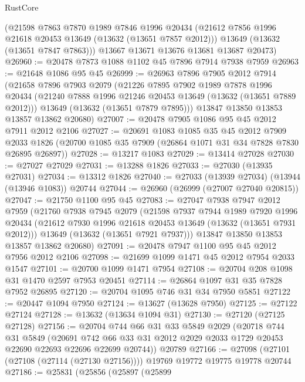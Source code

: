 \begin{lexlean}{RustCore}
\begin{coremodule}
      (@21598
        @7863
        @7870
        @1989
        @7846
        @1996
        @20434
        (@21612 @7856 @1996 @21618 @20453 @13649 (@13632 (@13651 @7857 @2012)))
        @13649
        (@13632 (@13651 @7847 @7863)))
      @13667
      @13671
      @13676
      @13681
      @13687
      @20473)
@26960 := @20478 @7873 @1088 @1102 @45 @7896 @7914 @7938 @7959
@26963 := @21648 @1086 @95 @45
@26999 := @26963
    @7896
    @7905
    @2012
    @7914
    (@21658
      @7896
      @7903
      @2079
      (@21226
        @7895
        @7902
        @1989
        @7878
        @1996
        @20434
        (@21240 @7888 @1996 @21246 @20453 @13649 (@13632 (@13651 @7889 @2012)))
        @13649
        (@13632 (@13651 @7879 @7895)))
      @13847
      @13850
      @13853
      @13857
      @13862
      @20680)
@27007 := @20478 @7905 @1086 @95 @45 @2012 @7911 @2012 @2106
@27027 := @20691
    @1083
    @1085
    @35
    @45
    @2012
    @7909
    @2033
    @1826
    (@20700 @1085 @35 @7909 (@26864 @1071 @31 @34 @7828 @7830 @26895 @26897))
@27028 := @13217 @1083
@27029 := @13414 @27028
@27030 := @27027 @27029
@27031 := @13288 @1826
@27033 := @27030 (@13935 @27031)
@27034 := @13312 @1826
@27040 := @27033 (@13939 @27034) (@13944 (@13946 @1083)) @20744
@27044 := @26960 (@26999 (@27007 @27040 @20815))
@27047 := @21750 @1100 @95 @45
@27083 := @27047
    @7938
    @7947
    @2012
    @7959
    (@21760
      @7938
      @7945
      @2079
      (@21598
        @7937
        @7944
        @1989
        @7920
        @1996
        @20434
        (@21612 @7930 @1996 @21618 @20453 @13649 (@13632 (@13651 @7931 @2012)))
        @13649
        (@13632 (@13651 @7921 @7937)))
      @13847
      @13850
      @13853
      @13857
      @13862
      @20680)
@27091 := @20478 @7947 @1100 @95 @45 @2012 @7956 @2012 @2106
@27098 := @21699 @1099 @1471 @45 @2012 @7954 @2033 @1547
@27101 := @20700 @1099 @1471 @7954
@27108 := @20704 @208 @1098 @31 @1470 @2597 @7953 @20451
@27114 := @26864 @1097 @31 @35 @7828 @7952 @26895
@27120 := @20704 @1095 @746 @31 @34 @7950 @5851
@27122 := @20447 @1094 @7950
@27124 := @13627 (@13628 @7950)
@27125 := @27122 @27124
@27128 := @13632 (@13634 @1094 @31)
@27130 := @27120 (@27125 @27128)
@27156 := @20704
    @744
    @66
    @31
    @33
    @5849
    @2029
    (@20718
      @744
      @31
      @5849
      (@20691 @742 @66 @33 @31 @2012 @2029 @2033 @1729 @20453 @22690 @22693 @22696 @22699 @20744))
    @20789
@27166 := @27098 (@27101 (@27108 (@27114 (@27130 @27156)))) @19769 @19772 @19775 @19778 @20744
@27186 := @25831
    (@25856
      (@25897
        (@25899

\end{coremodule}
\end{lexlean}
